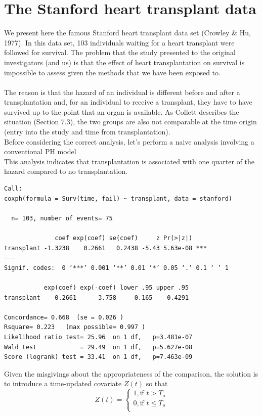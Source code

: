 \documentclass[10pt]{book}
\begin{document}
\section{The Stanford heart transplant data}
We present here the famous Stanford heart transplant data set (Crowley \& Hu, 1977).  In this data set, 103 individuals waiting for a heart transplant were followed for survival.  The problem that the study presented to the original investigators (and us) is that the effect of heart transplantation on survival is impossible to assess given the methods that we have been exposed to.\\
\\[2ex]
The reason is that the hazard of an individual is different before and after a transplantation and, for an individual to receive a transplant, they have to have survived up to the point that an organ is available.  As Collett describes the situation (Section 7.3), the two groups are also not comparable at the time origin (entry into the study and time from transplantation).\\[2ex]
Before considering the correct analysis, let's perform a naive analysis involving a conventional PH model
\\[2ex]
This analysis indicates that transplantation is associated with one quarter of the hazard compared to no transplantation.\newpage
\small
\begin{verbatim}
Call:
coxph(formula = Surv(time, fail) ~ transplant, data = stanford)

  n= 103, number of events= 75

              coef exp(coef) se(coef)     z Pr(>|z|)
transplant -1.3238    0.2661   0.2438 -5.43 5.63e-08 ***
---
Signif. codes:  0 ‘***’ 0.001 ‘**’ 0.01 ‘*’ 0.05 ‘.’ 0.1 ‘ ’ 1

           exp(coef) exp(-coef) lower .95 upper .95
transplant    0.2661      3.758     0.165    0.4291

Concordance= 0.668  (se = 0.026 )
Rsquare= 0.223   (max possible= 0.997 )
Likelihood ratio test= 25.96  on 1 df,   p=3.481e-07
Wald test            = 29.49  on 1 df,   p=5.627e-08
Score (logrank) test = 33.41  on 1 df,   p=7.463e-09
\end{verbatim}
\normalsize
Given the misgivings about the appropriateness of the comparison, the solution is to introduce a time-updated covariate $Z(t)$ so that
$$
Z(t)=\left \{ \begin{array}{c}
  1,\mbox{if } t>T_o \\
  0,\mbox{if } t\leq T_o\\
\end{array}\right .
$$
\end{document}
